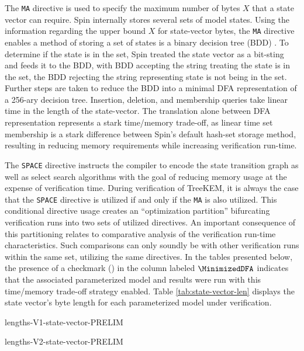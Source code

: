The \texttt{MA} directive is used to specify the maximum number of bytes \(X\) that a state vector can require.
Spin internally stores several sets of model states.
Using the information regarding the upper bound \(X\) for state-vector bytes, the \texttt{MA} directive enables a method of storing a set of states is a binary decision tree (BDD) \autocite{holzmann1999minimized}.
To determine if the state is in the set, Spin treated the state vector as a bit-sting and feeds it to the BDD, with BDD accepting the string treating the state is in the set, the BDD rejecting the string representing state is not being in the set.
Further steps are taken to reduce the BDD into a minimal DFA representation of a 256-ary decision tree.
Insertion, deletion, and membership queries take linear time in the length of the state-vector.
The translation alone between DFA representation represents a stark time/memory trade-off, as linear time set membership is a stark difference between Spin's default hash-set storage method, resulting in reducing memory requirements while increasing verification run-time.

The \texttt{SPACE} directive instructs the compiler to encode the state transition graph as well as select search algorithms with the goal of reducing memory usage at the expense of verification time.
During verification of TreeKEM, it is always the case that the \texttt{SPACE} directive is utilized if and only if the \texttt{MA} is also utilized.
This conditional directive usage creates an ``optimization partition'' bifurcating verification runs into two sets of utilized directives.
An important consequence of this partitioning relates to comparative analysis of the verification run-time characteristics.
Such comparisons can only soundly be with other verification runs within the same set, utilizing the same directives.
In the tables presented below, the presence of a checkmark (\cmark) in the column labeled $\MinimizedDFA$ indicates that the associated parameterized model and results were run with this time/memory trade-off strategy enabled.
Table \ref{tab:state-vector-len} displays the state vector's byte length for each \CGKAmod{\VersionOne}{}{} parameterized model under verification.

\begin{table}[h!]
\caption[State vector byte length for each model]{%
\label{tab:state-vector-len}%
State vector byte length for each model parameterization of \CGKAmod{\VersionOne}{}{} and \CGKAmod{\VersionTwo}{}{}.
}%
\hfill
\begin{minipage}{0.45\textwidth}
  \centering
  {lengths-V1-state-vector-PRELIM}
\end{minipage}
\begin{minipage}{0.45\textwidth}
  \centering
  {lengths-V2-state-vector-PRELIM}
\end{minipage}
\hfill
\end{table}

